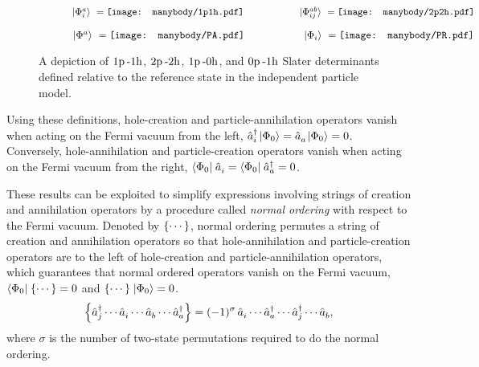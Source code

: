 \documentclass[thesis.tex]{subfiles}
\begin{document}
\begin{figure}
  \centering
  \begin{subfigure}{\textwidth}
    \centering
    $\ket{\Phi^{a}_{i}}\ = \vcenter{\hbox{\texttt{[image: manybody/1p1h.pdf]}}} \hspace{2cm} \ket{\Phi^{ab}_{ij}}\ = \vcenter{\hbox{\texttt{[image: manybody/2p2h.pdf]}}}$
  \end{subfigure}
  \vspace{0.5cm}
  
  \begin{subfigure}{\textwidth}
    \centering
    $\ket{\Phi^{a}}\ = \vcenter{\hbox{\texttt{[image: manybody/PA.pdf]}}} \hspace{2cm} \ket{\Phi_{i}}\ = \vcenter{\hbox{\texttt{[image: manybody/PR.pdf]}}}$
  \end{subfigure}
  \caption{A depiction of $1\mathrm{p}\hspace{2pt}\text{-}1\mathrm{h}$, $2\mathrm{p}\hspace{2pt}\text{-}2\mathrm{h}$, $1\mathrm{p}\hspace{2pt}\text{-}0\mathrm{h}$, and $0\mathrm{p}\hspace{2pt}\text{-}1\mathrm{h}$ Slater determinants defined relative to the reference state in the independent particle model.}
  \label{fig:excitations}
\end{figure}
  
Using these definitions, hole-creation and particle-annihilation operators vanish when acting on the Fermi vacuum from the left, $\mathop{\hat{a}^{\dagger}_{i}}\hspace{1pt}\lvert \Phi_{0} \rangle=\mathop{\hat{a}^{}_{a}}\hspace{1pt}\lvert \Phi_{0} \rangle=0$. Conversely, hole-annihilation and particle-creation operators vanish when acting on the Fermi vacuum from the right, $\langle \Phi_{0} |\hspace{1pt}\mathop{\hat{a}^{}_{i}}=\langle \Phi_{0} |\hspace{1pt}\mathop{\hat{a}^{\dagger}_{a}}=0$.

These results can be exploited to simplify expressions involving strings of creation and annihilation operators by a procedure called \textit{normal ordering} with respect to the Fermi vacuum. Denoted by $\left\{\cdots\right\}$, normal ordering permutes a string of creation and annihilation operators so that hole-annihilation and particle-creation operators are to the left of hole-creation and particle-annihilation operators, which guarantees that normal ordered operators vanish on the Fermi vacuum, $\langle \Phi_{0} |\hspace{1pt}\left\{\cdots\right\} = 0$ and $\left\{\cdots\right\}\hspace{1pt}\lvert \Phi_{0} \rangle = 0$.
\begin{equation} \label{eq:normorddef}
  \left\{\mathop{\hat{a}^{\dagger}_{j}}\cdots\mathop{\hat{a}^{}_{i}}\cdots\mathop{\hat{a}^{}_{b}}\cdots\mathop{\hat{a}^{\dagger}_{a}}\right\} = (-1)^{\sigma}\mathop{\hat{a}^{}_{i}}\cdots\mathop{\hat{a}^{\dagger}_{a}}\cdots\mathop{\hat{a}^{\dagger}_{j}}\cdots\mathop{\hat{a}^{}_{b}},
\end{equation}
where $\sigma$ is the number of two-state permutations required to do the normal ordering.
\end{document}
